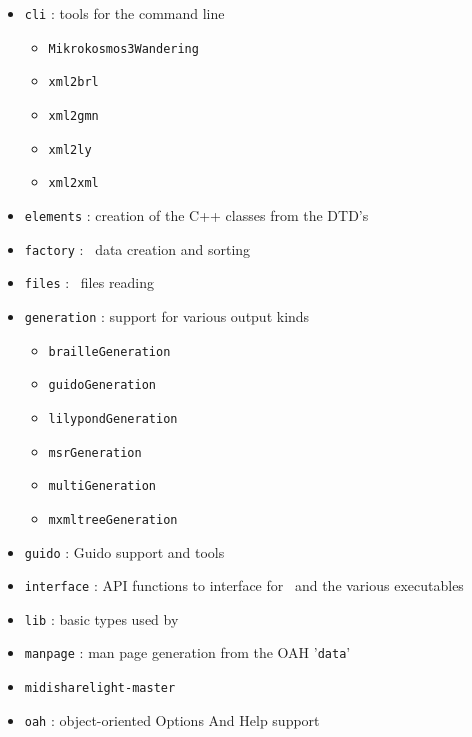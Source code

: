 \documentclass[12pt,a4paper]{article}
\begin{document}
\begin{itemize}

\item {\tt cli} : tools for the command line

  \begin{itemize}
  \item {\tt Mikrokosmos3Wandering}
  \item {\tt xml2brl}
  \item {\tt xml2gmn}
  \item {\tt xml2ly}
  \item {\tt xml2xml}
  \end{itemize}

\item {\tt elements} : creation of the C++ classes from the DTD's

\item {\tt factory} : \mxmlt\ data creation and sorting

\item {\tt files} : \mxml\ files reading

\item {\tt generation} : support for various output kinds

  \begin{itemize}
  \item {\tt brailleGeneration}
  \item {\tt guidoGeneration}
  \item {\tt lilypondGeneration}
  \item {\tt msrGeneration}
  \item {\tt multiGeneration}
  \item {\tt mxmltreeGeneration}
  \end{itemize}

\item {\tt guido} : Guido support and tools

\item {\tt interface} : API functions to interface for \lib\ and the various executables

\item {\tt lib} : basic types used by \lib\

\item {\tt manpage} : man page generation from the OAH '{\tt data}'
%
\item {\tt midisharelight-master}

\item {\tt oah} : object-oriented Options And Help support


\end{itemize}
\end{document}
